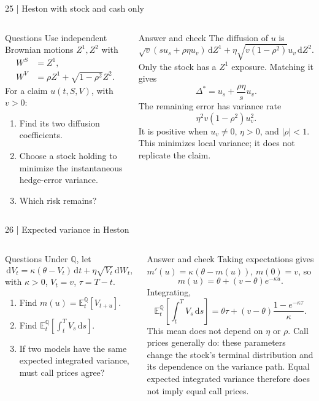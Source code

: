 \documentclass[handout,10pt,t,aspectratio=169]{beamer}
\newcommand{\E}{\mathbb E}
\newcommand{\Q}{\mathbb Q}
\newcommand{\dd}{\,\mathrm d}
\newenvironment{questions}{\begin{block}{Questions}}{\end{block}}
\newenvironment{answers}{\begin{exampleblock}{Answer and check}}{\end{exampleblock}}
\newcommand{\compact}{\small%
 \setlength{\abovedisplayskip}{3pt}%
 \setlength{\belowdisplayskip}{3pt}%
 \setlength{\abovedisplayshortskip}{2pt}%
 \setlength{\belowdisplayshortskip}{2pt}%
 \setlength{\parskip}{2pt}}
\begin{document}
\begin{frame}{25 | Heston with stock and cash only}
\compact
\begin{columns}[T,onlytextwidth]
\begin{questions}
Use independent Brownian motions \(Z^1,Z^2\) with
\[
 \begin{aligned}
 W^S&=Z^1,\\
 W^V&=\rho Z^1+\sqrt{1-\rho^2}Z^2.
 \end{aligned}
\]
For a claim \(u(t,S,V)\), with \(v>0\):
\begin{enumerate}
\item Find its two diffusion coefficients.
\item Choose a stock holding to minimize the instantaneous hedge-error variance.
\item Which risk remains?
\end{enumerate}
\end{questions}
\begin{answers}
The diffusion of \(u\) is
\[
 \sqrt v(su_s+\rho\eta u_v)\dd Z^1
 +\eta\sqrt{v(1-\rho^2)}u_v\dd Z^2.
\]
Only the stock has a \(Z^1\) exposure. Matching it gives
\[
 \boxed{\Delta^*=u_s+\frac{\rho\eta}{s}u_v.}
\]
The remaining error has variance rate
\[
 \boxed{\eta^2v(1-\rho^2)u_v^2.}
\]
It is positive when \(u_v\ne0\), \(\eta>0\), and \(|\rho|<1\).
This minimizes local variance; it does not replicate the claim.
\end{answers}
\end{columns}
\end{frame}

\begin{frame}{26 | Expected variance in Heston}
\compact
\begin{columns}[T,onlytextwidth]
\begin{questions}
Under \(\Q\), let
\[
 \dd V_t=\kappa(\theta-V_t)\dd t
       +\eta\sqrt{V_t}\dd W_t,
\]
with \(\kappa>0\), \(V_t=v\), \(\tau=T-t\).
\begin{enumerate}
\item Find \(m(u)=\E_t^\Q[V_{t+u}]\).
\item Find \(\E_t^\Q[\int_t^T V_s\dd s]\).
\item If two models have the same expected integrated variance, must call prices agree?
\end{enumerate}
\end{questions}
\begin{answers}
Taking expectations gives \(m'(u)=\kappa(\theta-m(u))\), \(m(0)=v\), so
\[
 \boxed{m(u)=\theta+(v-\theta)e^{-\kappa u}.}
\]
Integrating,
\[
 \boxed{\E_t^\Q\!\left[\int_t^T V_s\dd s\right]
 =\theta\tau+(v-\theta)\frac{1-e^{-\kappa\tau}}\kappa.}
\]
This mean does not depend on \(\eta\) or \(\rho\).
Call prices generally do: these parameters change the stock's terminal
distribution and its dependence on the variance path.
Equal expected integrated variance therefore does not imply equal call prices.
\end{answers}
\end{columns}
\end{frame}
\end{document}
